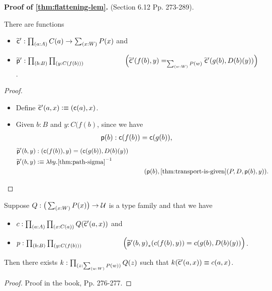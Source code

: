 \documentclass[centering]{report}
\newenvironment{slide}
    {\newpage
    \vspace*{\fill}
    }
    { 
     \vspace*{\fill}
    }
\begin{document}
\begin{slide}
\textbf{Proof of \cref{thm:flattening-lem}.} (Section 6.12 Pp. 273-289).
\begin{lem}\label{thm:flattening-cp}
  There are functions
  \begin{itemize}
  \item $\cct':\prd{a:A} C(a) \to \sm{x:W} P(x)$ and
  \item $\ppt':\prd{b:B}{y:C(f(b))} \\\hspace*{20mm}
   \Big(\cct'(f(b),y)=_{\sm{w:W}P(w)}\cct'(g(b),D(b)(y))\Big)$.
  \end{itemize}
\end{lem}
\begin{proof}\hspace{5cm}
  \begin{itemize}
    \item Define $\widetilde{\mathsf{c}}'(a,x) \vcentcolon\equiv (\mathsf{c}(a),x)$.
    \item
Given  $b:B$ and $y:C(f(b)$, since we have
\begin{align*}
\mathsf{p}(b):\mathsf{c}(f(b))=\mathsf{c}(g(b)),
\end{align*}
\begin{align*}
 &\ppt'(b,y) : (\cc(f(b)),y) = (\cc(g(b)),D(b)(y))\\
 &\ppt'(b,y) \defeq \lambda b y.\opp{\text{\cref{thm:path-sigma}}}\\
  &\hspace{70mm}(\pp(b), \cref{thm:transport-is-given}(P,D,\pp(b),y)).
\end{align*}
  \end{itemize}
\end{proof}
\end{slide}

\begin{slide}
\begin{lem}\label{thm:flattening-rect}
  Suppose $Q:\big(\sm{x:W} P(x)\big) \to \type$ is a type family and that we have\\[2mm]
  \begin{itemize}
  \item $c : \prd{a:A}{x:C(a)} Q(\cct'(a,x))$ and
  \item $p : \prd{b:B}{y:C(f(b))}\\
  \hspace*{20mm}\Big(\trans{\ppt'(b,y)}{c(f(b),y)} = c(g(b),D(b)(y))\Big)$. %
  \end{itemize}
  \vspace*{2mm}
  Then there exists $k:\prd{z:\sm{w:W} P(w)} Q(z)$ such that $k(\widetilde{\mathsf{c}}'(a,x)) \equiv c(a,x)$.
\end{lem}
\begin{proof} Proof in the book, Pp. 276-277.
\end{proof}
\end{slide}
\end{document}

